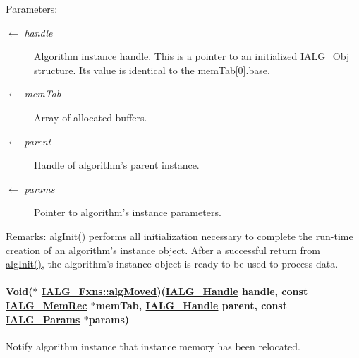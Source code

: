 \begin{Desc}
\item[Parameters:]
\begin{description}
\item[\mbox{$\leftarrow$} {\em handle}]Algorithm instance handle. This is a pointer to an initialized \hyperlink{struct_i_a_l_g___obj}{IALG\_\-Obj} structure. Its value is identical to the mem\-Tab\mbox{[}0\mbox{]}.base. \item[\mbox{$\leftarrow$} {\em mem\-Tab}]Array of allocated buffers. \item[\mbox{$\leftarrow$} {\em parent}]Handle of algorithm's parent instance. \item[\mbox{$\leftarrow$} {\em params}]Pointer to algorithm's instance parameters.\end{description}
\end{Desc}
\begin{Desc}
\item[Remarks:]\hyperlink{struct_i_a_l_g___fxns_94eca7c58cceb112eccd970a6cf3f569}{alg\-Init()} performs all initialization necessary to complete the run-time creation of an algorithm's instance object. After a successful return from \hyperlink{struct_i_a_l_g___fxns_94eca7c58cceb112eccd970a6cf3f569}{alg\-Init()}, the algorithm's instance object is ready to be used to process data. \end{Desc}
\hypertarget{struct_i_a_l_g___fxns_5456c5087825b808e18000c551a66ef1}{
\paragraph[algMoved]{\setlength{\rightskip}{0pt plus 5cm}Void($\ast$ \hyperlink{struct_i_a_l_g___fxns_5456c5087825b808e18000c551a66ef1}{IALG\_\-Fxns::alg\-Moved})(\hyperlink{struct_i_a_l_g___obj}{IALG\_\-Handle} handle, const \hyperlink{struct_i_a_l_g___mem_rec}{IALG\_\-Mem\-Rec} $\ast$mem\-Tab, \hyperlink{struct_i_a_l_g___obj}{IALG\_\-Handle} parent, const \hyperlink{struct_i_a_l_g___params}{IALG\_\-Params} $\ast$params)}\hfill}
\label{struct_i_a_l_g___fxns_5456c5087825b808e18000c551a66ef1}


Notify algorithm instance that instance memory has been relocated. 

